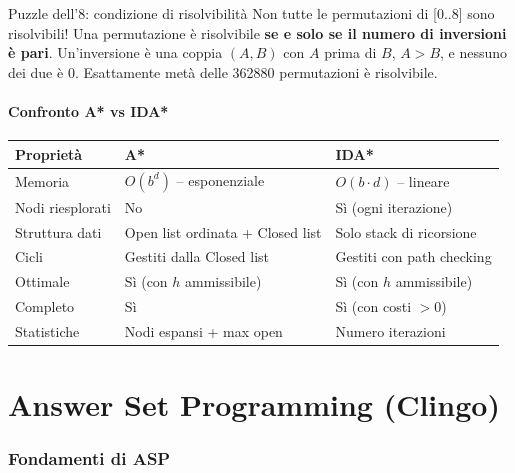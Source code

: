 \documentclass[12pt,a4paper]{article}
\begin{document}
\begin{keybox}{Puzzle dell'8: condizione di risolvibilità}
Non tutte le permutazioni di [0..8] sono risolvibili! Una permutazione è
risolvibile \textbf{se e solo se il numero di inversioni è pari}.
Un'inversione è una coppia $(A, B)$ con $A$ prima di $B$, $A > B$, e nessuno
dei due è 0. Esattamente metà delle 362880 permutazioni è risolvibile.
\end{keybox}

\subsection{Confronto A* vs IDA*}

\begin{center}
\renewcommand{\arraystretch}{1.4}
\begin{tabular}{lll}
\toprule
\textbf{Proprietà} & \textbf{A*} & \textbf{IDA*} \\
\midrule
Memoria & $O(b^d)$ -- esponenziale & $O(b \cdot d)$ -- lineare \\
Nodi riesplorati & No & Sì (ogni iterazione) \\
Struttura dati & Open list ordinata + Closed list & Solo stack di ricorsione \\
Cicli & Gestiti dalla Closed list & Gestiti con path checking \\
Ottimale & Sì (con $h$ ammissibile) & Sì (con $h$ ammissibile) \\
Completo & Sì & Sì (con costi $> 0$) \\
Statistiche & Nodi espansi + max open & Numero iterazioni \\
\bottomrule
\end{tabular}
\end{center}

\part{Answer Set Programming (Clingo)}

\section{Fondamenti di ASP}
\end{document}
